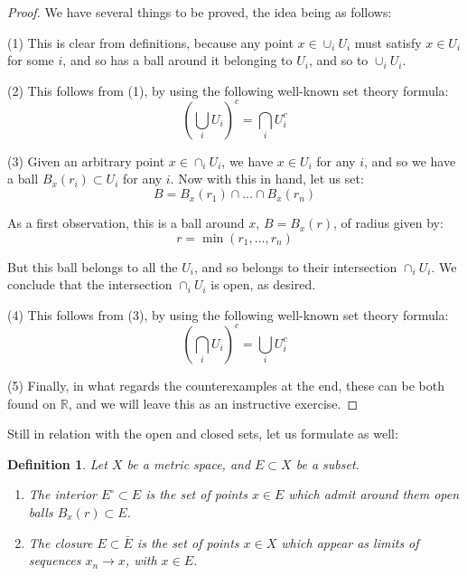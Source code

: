 \documentclass[12pt]{amsbook}
\newtheorem{definition}[theorem]{Definition}
\begin{document}
\begin{proof}
We have several things to be proved, the idea being as follows:

\medskip

(1) This is clear from definitions, because any point $x\in\cup_iU_i$ must satisfy $x\in U_i$ for some $i$, and so has a ball around it belonging to $U_i$, and so to $\cup_iU_i$.

\medskip

(2) This follows from (1), by using the following well-known set theory formula:
$$\left(\bigcup_iU_i\right)^c=\bigcap_iU_i^c$$

(3) Given an arbitrary point $x\in\cap_iU_i$, we have $x\in U_i$ for any $i$, and so we have a ball $B_x(r_i)\subset U_i$ for any $i$. Now with this in hand, let us set:
$$B=B_x(r_1)\cap\ldots\cap B_x(r_n)$$

As a first observation, this is a ball around $x$, $B=B_x(r)$, of radius given by:
$$r=\min(r_1,\ldots,r_n)$$

But this ball belongs to all the $U_i$, and so belongs to their intersection $\cap_iU_i$. We conclude that the intersection $\cap_iU_i$ is open, as desired.

\medskip

(4) This follows from (3), by using the following well-known set theory formula:
$$\left(\bigcap_iU_i\right)^c=\bigcup_iU_i^c$$

(5) Finally, in what regards the counterexamples at the end, these can be both found on $\mathbb R$, and we will leave this as an instructive exercise.
\end{proof}

Still in relation with the open and closed sets, let us formulate as well:


\begin{definition}
Let $X$ be a metric space, and $E\subset X$ be a subset.
\begin{enumerate}
\item The interior $E^\circ\subset E$ is the set of points $x\in E$ which admit around them open balls $B_x(r)\subset E$.

\item The closure $E\subset\bar{E}$ is the set of points $x\in X$ which appear as limits of sequences $x_n\to x$, with $x\in E$.
\end{enumerate}
\end{definition}
\end{document}
